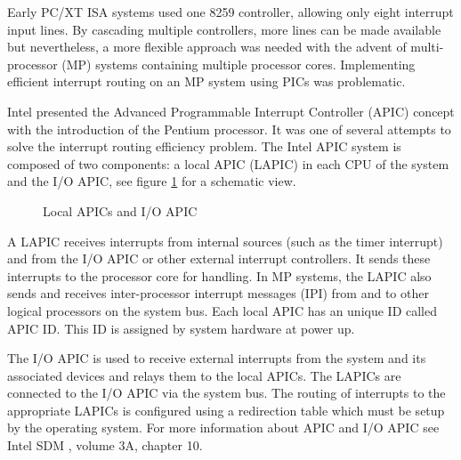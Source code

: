 Early PC/XT ISA systems used one 8259 controller, allowing only eight
interrupt input lines. By cascading multiple controllers, more lines can be made
available but nevertheless, a more flexible approach was needed with the advent
of multi-processor (MP) systems containing multiple processor cores.
Implementing efficient interrupt routing on an MP system using PICs was
problematic.

Intel presented the Advanced Programmable Interrupt Controller
(APIC) concept with the introduction of the Pentium processor. It
was one of several attempts to solve the interrupt routing efficiency problem.
The Intel APIC system is composed of two components: a local APIC
(LAPIC) in each CPU of the system and the I/O APIC,
see figure \ref{fig:apic} for a schematic view.

\begin{figure}[h]
	\centering
	
	\caption{Local APICs and I/O APIC}
	\label{fig:apic}
\end{figure}

A LAPIC receives interrupts from internal sources (such as the timer interrupt)
and from the I/O APIC or other external interrupt controllers. It sends these
interrupts to the processor core for handling. In MP systems, the LAPIC also
sends and receives inter-processor interrupt messages (IPI) from and
to other logical processors on the system bus. Each local APIC has an unique ID
called APIC ID. This ID is assigned by system hardware at power
up.

The I/O APIC is used to receive external interrupts from the system and its
associated devices and relays them to the local APICs. The LAPICs are connected
to the I/O APIC via the system bus. The routing of interrupts to the appropriate
LAPICs is configured using a redirection table which must be setup by the
operating system. For more information about APIC and I/O APIC see Intel SDM
\cite{IntelSDM}, volume 3A, chapter 10.
